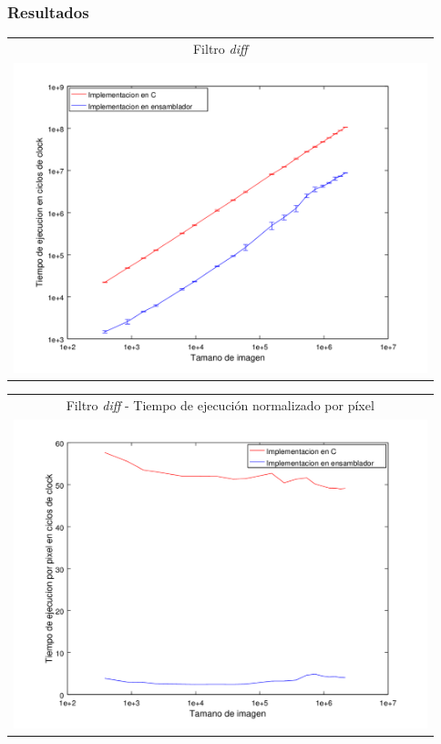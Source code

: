 		\subsubsection*{Resultados}
		   	{\centering \begin{tabular}{c}
		      {\small Filtro \emph{diff}} \\
		      \includegraphics[width=12cm]{../exp/graficos/exp1-diff-c_vs_asm.png} \\
		    \end{tabular}}

		    {\centering \begin{tabular}{c}
		      {\small Filtro \emph{diff} - Tiempo de ejecución normalizado por píxel} \\
		      \includegraphics[width=12cm]{../exp/graficos/exp1-diff-tiempo_por_pixel.png} \\
		    \end{tabular}}

